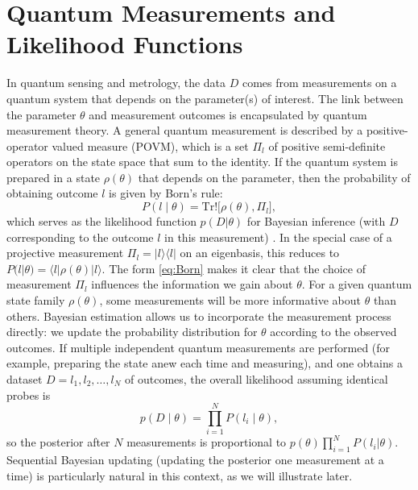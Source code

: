 \section{Quantum Measurements and Likelihood Functions}

In quantum sensing and metrology, the data $D$ comes from measurements
on a quantum system that depends on the parameter(s) of interest. The
link between the parameter $\theta$ and measurement outcomes is
encapsulated by quantum measurement theory. A general quantum
measurement is described by a positive-operator valued measure (POVM),
which is a set ${\Pi_l}$ of positive semi-definite operators on the
state space that sum to the identity. If the quantum system is
prepared in a state $\rho(\theta)$ that depends on the parameter, then
the probability of obtaining outcome $l$ is given by Born’s rule:
\begin{equation}
P(l \mid \theta) = \mathrm{Tr}!\big[\rho(\theta), \Pi_l\big],
\label{eq:Born}
\end{equation}
which serves as the likelihood function $p(D|\theta)$ for Bayesian
inference (with $D$ corresponding to the outcome $l$ in this
measurement) . In the special case of a projective measurement ${\Pi_l
  = |l\rangle\langle l|}$ on an eigenbasis, this reduces to
$P(l|\theta) = \langle l|\rho(\theta)|l\rangle$. The form
\eqref{eq:Born} makes it clear that the choice of measurement
${\Pi_l}$ influences the information we gain about $\theta$. For a
given quantum state family $\rho(\theta)$, some measurements will be
more informative about $\theta$ than others. Bayesian estimation
allows us to incorporate the measurement process directly: we update
the probability distribution for $\theta$ according to the observed
outcomes. If multiple independent quantum measurements are performed
(for example, preparing the state anew each time and measuring), and
one obtains a dataset $D = {l_1, l_2, \dots, l_N}$ of outcomes, the
overall likelihood assuming identical probes is
\[
p(D \mid \theta) = \prod_{i=1}^N P(l_i \mid \theta),
\]
so the posterior after $N$ measurements is proportional to $p(\theta)
\prod_{i=1}^N P(l_i|\theta)$. Sequential Bayesian updating (updating
the posterior one measurement at a time) is particularly natural in
this context, as we will illustrate later.




